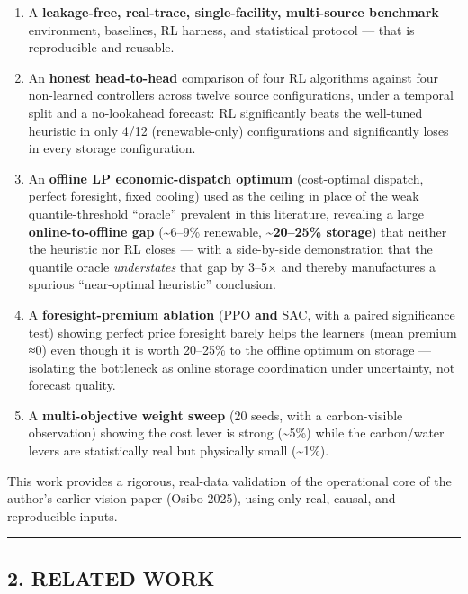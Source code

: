 \documentclass[
  11pt,
]{article}
\providecommand{\tightlist}{%
  \setlength{\itemsep}{0pt}\setlength{\parskip}{0pt}}
\begin{document}
\begin{enumerate}
\def\labelenumi{\arabic{enumi}.}
\tightlist
\item
  A \textbf{leakage-free, real-trace, single-facility, multi-source
  benchmark} --- environment, baselines, RL harness, and statistical
  protocol --- that is reproducible and reusable.
\item
  An \textbf{honest head-to-head} comparison of four RL algorithms
  against four non-learned controllers across twelve source
  configurations, under a temporal split and a no-lookahead forecast: RL
  significantly beats the well-tuned heuristic in only 4/12
  (renewable-only) configurations and significantly loses in every
  storage configuration.
\item
  An \textbf{offline LP economic-dispatch optimum} (cost-optimal
  dispatch, perfect foresight, fixed cooling) used as the ceiling in
  place of the weak quantile-threshold ``oracle'' prevalent in this
  literature, revealing a large \textbf{online-to-offline gap}
  (\textasciitilde6--9\% renewable, \textbf{\textasciitilde20--25\%
  storage}) that neither the heuristic nor RL closes --- with a
  side-by-side demonstration that the quantile oracle \emph{understates}
  that gap by 3--5× and thereby manufactures a spurious ``near-optimal
  heuristic'' conclusion.
\item
  A \textbf{foresight-premium ablation} (PPO \textbf{and} SAC, with a
  paired significance test) showing perfect price foresight barely helps
  the learners (mean premium ≈0) even though it is worth 20--25\% to the
  offline optimum on storage --- isolating the bottleneck as online
  storage coordination under uncertainty, not forecast quality.
\item
  A \textbf{multi-objective weight sweep} (20 seeds, with a
  carbon-visible observation) showing the cost lever is strong
  (\textasciitilde5\%) while the carbon/water levers are statistically
  real but physically small (\textasciitilde1\%).
\end{enumerate}

This work provides a rigorous, real-data validation of the operational
core of the author's earlier vision paper (Osibo 2025), using only real,
causal, and reproducible inputs.

\begin{center}\rule{0.5\linewidth}{0.5pt}\end{center}

\subsection{2. RELATED WORK}\label{related-work}
\end{document}
